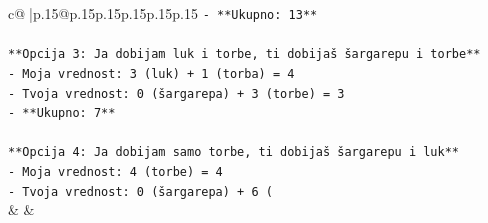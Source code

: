 \documentclass{article}
\begin{document}
{\begin{supertabular}{c@{$\;$}|p{.15\linewidth}@{}p{.15\linewidth}p{.15\linewidth}p{.15\linewidth}p{.15\linewidth}p{.15\linewidth}}
{{{\texttt{{-} **Ukupno: 13**} \\
\\ 
\texttt{**Opcija 3: Ja dobijam luk i torbe, ti dobijaš šargarepu i torbe**} \\
\texttt{{-} Moja vrednost: 3 (luk) + 1 (torba) = 4} \\
\texttt{{-} Tvoja vrednost: 0 (šargarepa) + 3 (torbe) = 3} \\
\texttt{{-} **Ukupno: 7**} \\
\\ 
\texttt{**Opcija 4: Ja dobijam samo torbe, ti dobijaš šargarepu i luk**} \\
\texttt{{-} Moja vrednost: 4 (torbe) = 4} \\
\texttt{{-} Tvoja vrednost: 0 (šargarepa) + 6 (} \\
            }
        }
    }
    & & \\ \\


\end{supertabular}}
\end{document}
